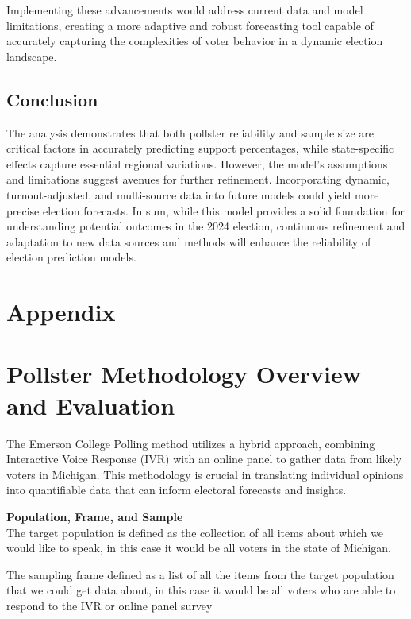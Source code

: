 \documentclass[
  letterpaper,
  DIV=11,
  numbers=noendperiod]{scrartcl}
\begin{document}
Implementing these advancements would address current data and model
limitations, creating a more adaptive and robust forecasting tool
capable of accurately capturing the complexities of voter behavior in a
dynamic election landscape.

\subsection{Conclusion}\label{conclusion}

The analysis demonstrates that both pollster reliability and sample size
are critical factors in accurately predicting support percentages, while
state-specific effects capture essential regional variations. However,
the model's assumptions and limitations suggest avenues for further
refinement. Incorporating dynamic, turnout-adjusted, and multi-source
data into future models could yield more precise election forecasts. In
sum, while this model provides a solid foundation for understanding
potential outcomes in the 2024 election, continuous refinement and
adaptation to new data sources and methods will enhance the reliability
of election prediction models.

\newpage

\appendix

\section*{Appendix}\label{appendix}

\section{Pollster Methodology Overview and
Evaluation}\label{pollster-methodology-overview-and-evaluation}

The Emerson College Polling method utilizes a hybrid approach, combining
Interactive Voice Response (IVR) with an online panel to gather data
from likely voters in Michigan. This methodology is crucial in
translating individual opinions into quantifiable data that can inform
electoral forecasts and insights.

\textbf{Population, Frame, and Sample}\\
The target population is defined as the collection of all items about
which we would like to speak, in this case it would be all voters in the
state of Michigan.

The sampling frame defined as a list of all the items from the target
population that we could get data about, in this case it would be all
voters who are able to respond to the IVR or online panel survey
\end{document}
